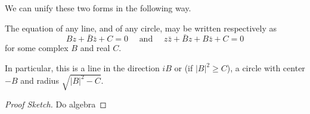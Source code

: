 \documentclass[a4paper]{scrreprt}
\begin{document}
We can unify these two forms in the following way.

\begin{proposition}
	The equation of any line, and of any circle, may be written respectively as
$$
B z+\bar{B} \bar{z}+C=0 \quad \text { and } \quad z \bar{z}+\bar{B} z+B \bar{z}+C=0
$$
for some complex $B$ and real $C$.

In particular, this is a line in the direction $iB$ or (if $|B|^2 \geq C$), a circle with center $-B$ and radius $\sqrt{|B|^2 - C}$.
\end{proposition}
\begin{proof}[Proof Sketch]
	Do algebra
\end{proof}
\end{document}
